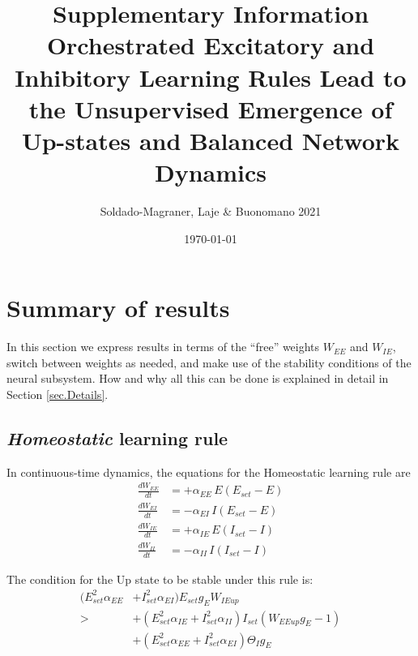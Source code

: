 \documentclass[twocolumn]{article}
\newcommand{\EE}{\mathit{EE}}
\newcommand{\EI}{\mathit{EI}}
\newcommand{\IE}{\mathit{IE}}
\newcommand{\II}{\mathit{II}}
\newcommand{\set}{\mathit{set}}
\newcommand{\up}{\mathit{up}}
\begin{document}
\title{\vspace{-2.0cm}Supplementary Information\\{\bf Orchestrated Excitatory and Inhibitory Learning Rules Lead to the Unsupervised Emergence of Up-states and Balanced Network Dynamics}}
\author{Soldado-Magraner, Laje \& Buonomano 2021}
\date{\today}

\maketitle

\tableofcontents

\section{Summary of results}

In this section we express results in terms of the ``free'' weights $W_{\EE}$ and $W_{\IE}$, switch between weights as needed, and make use of the stability conditions of the neural subsystem. How and why all this can be done is explained in detail in Section \ref{sec.Details}.


\subsection{{\em Homeostatic} learning rule}

In continuous-time dynamics, the equations for the Homeostatic learning rule are
\begin{equation}
\begin{aligned}
\frac{dW_{\EE}}{dt} & = +\alpha_{\EE} \, E (E_{\set} - E) \\
\frac{dW_{\EI}}{dt} & = -\alpha_{\EI} \, I (E_{\set} - E) \\
\frac{dW_{\IE}}{dt} & = +\alpha_{\IE} \, E (I_{\set} - I) \\
\frac{dW_{\II}}{dt} & = -\alpha_{\II} \, I (I_{\set} - I)
\end{aligned}
\label{eq.SH_summary}
\end{equation}

\noindent The condition for the Up state to be stable under this rule is:
\begin{equation}
\begin{aligned}
(E_{\set}^2 \alpha_{\EE} & + I_{\set}^2 \alpha_{\EI}) E_{\set} g_E W_{\IE\up} \\
> & + (E_{\set}^2 \alpha_{\IE} + I_{\set}^2 \alpha_{\II}) I_{\set}(W_{\EE\up} g_E - 1) \\
& + (E_{\set}^2 \alpha_{\EE} + I_{\set}^2 \alpha_{\EI}) \Theta_I g_E
\end{aligned}
\label{eq.SH_stable_cond_v1_summary}
\end{equation}
\end{document}
